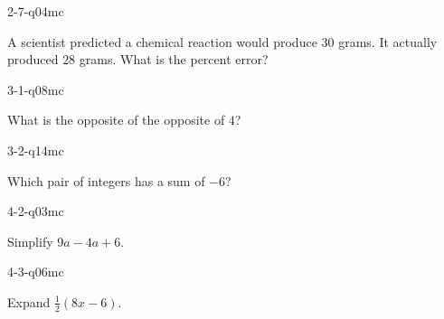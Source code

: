 \begin{practiceQuestion}{2-7-q04}{mc}
\begin{questionText}
A scientist predicted a chemical reaction would produce $30$ grams. It actually produced $28$ grams. What is the percent error?
\end{questionText}
\end{practiceQuestion}

\begin{practiceQuestion}{3-1-q08}{mc}
\begin{questionText}
What is the opposite of the opposite of $4$?
\end{questionText}
\end{practiceQuestion}

\begin{practiceQuestion}{3-2-q14}{mc}
\begin{questionText}
Which pair of integers has a sum of $-6$?
\end{questionText}
\end{practiceQuestion}

\begin{practiceQuestion}{4-2-q03}{mc}
\begin{questionText}
Simplify $9a - 4a + 6$.
\end{questionText}
\end{practiceQuestion}

\begin{practiceQuestion}{4-3-q06}{mc}
\begin{questionText}
Expand $\frac{1}{2}(8x - 6)$.


\end{questionText}
\end{practiceQuestion}

